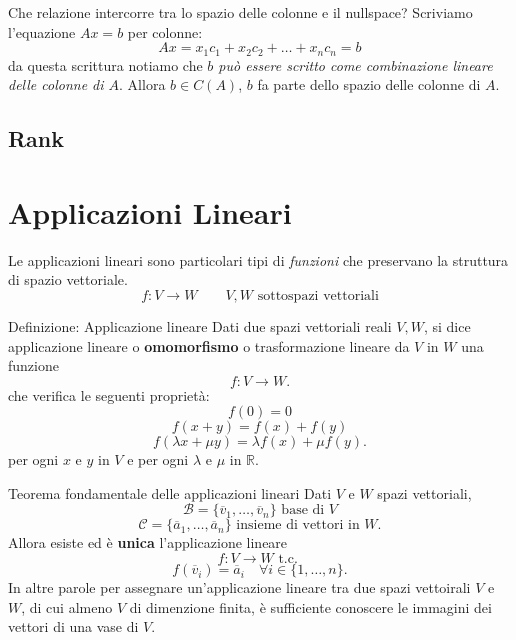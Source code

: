 \documentclass[x11names]{article}
\begin{document}
Che relazione intercorre tra lo spazio delle colonne e il nullspace?
Scriviamo l'equazione $Ax = b$ per colonne:
\[
	Ax = x_1c_1 + x_2c_{2} + \dots + x_{n}c_{n} = b
\] 
da questa scrittura notiamo che \textit{$b$ può essere scritto come combinazione lineare delle colonne di $A$}. Allora $b \in C\left(A\right)$, $b$ fa parte dello spazio delle colonne di $A$. 

\subsection{Rank}





\newpage
\section{Applicazioni Lineari}
Le applicazioni lineari sono particolari tipi di \textit{funzioni} che preservano la struttura di spazio vettoriale.
\[
f: V \longrightarrow W \qquad V,W \text{ sottospazi vettoriali}
\] 


\begin{center}
\colorbox{myblue}{\begin{minipage}{5.75in}
\begin{blues}{Definizione: Applicazione lineare}
	Dati due spazi vettoriali reali $V,W$, si dice applicazione lineare o \textbf{omomorfismo} o trasformazione lineare da $V$ in  $W$ una funzione
\[
f: V \longrightarrow W 
.\] 
che verifica le seguenti proprietà:
\[
f\left(0\right) = 0
\] 
\[
f\left(x+y\right) = f\left(x\right) + f\left(y\right)
\] 
\[
f\left(\lambda x + \mu y\right) = \lambda f\left(x\right) + \mu f\left(y\right) 
.\] 
per ogni $x$ e  $y$ in $V$ e per ogni $\lambda$ e $\mu$ in $\mathbb{R}$.
\end{blues}
\end{minipage}}        
\end{center}





\begin{center}
\colorbox{myred}{\begin{minipage}{5.75in}
\begin{redes}{Teorema fondamentale delle applicazioni lineari}
Dati $V$ e  $W$ spazi vettoriali,
\[
\mathscr{B} = \{\overline{v}_{1},\dots,\overline{v}_{n}\} \text{ base di }V
\] 
\[
\mathscr{C} = \{\overline{a}_{1},\dots,\overline{a}_{n}\} \text{ insieme di vettori in }W
.\] 
Allora esiste ed è \textbf{unica} l'applicazione lineare
\[
f: V \longrightarrow W \text{ t.c. }
\] 
\[
f\left(\overline{v}_{i}\right) = \overline{a}_{i} \quad \forall i \in \{1,\dots,n\}
.\] 
In altre parole per assegnare un'applicazione lineare tra due spazi vettoirali $V$ e $W$, di cui almeno $V$ di dimenzione finita, è sufficiente conoscere le immagini dei vettori di una vase di $V$.
\end{redes}
\end{minipage}}        
\end{center}
\end{document}
